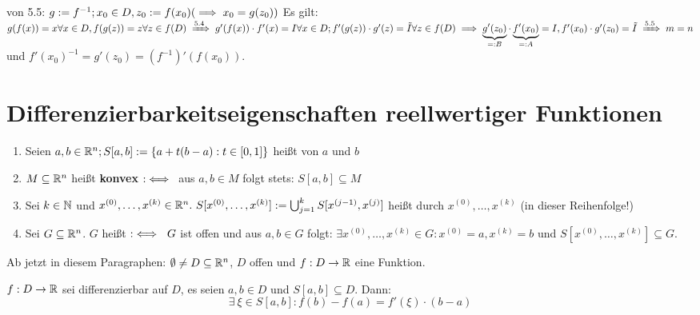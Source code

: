 \documentclass[a4paper,oneside,DIV15,BCOR12mm,chapterprefix=true,headings=onelinechapter]{scrbook}
\begin{document}
\begin{beweis} von 5.5: $g:=f^{-1}; x_0 \in D, z_0:=f(x_0) (\implies x_0 = g(z_0))$
Es gilt: $g(f(x)) = x \forall x \in D, f(g(z)) = z \forall z \in f(D) \folgtnach{5.4} g'(f(x))\cdot f'(x) = I \forall x \in D; f'(g(z))\cdot g'(z) = \tilde{I}
\forall z \in f(D) \folgt \underbrace{g'(z_0)}_{=:B}\cdot \underbrace{f'(x_0)}_{=:A} = I, f'(x_0)\cdot g'(z_0) = \tilde{I} \folgtnach{5.5} m = n$ und $f'(x_0)^{-1} = g'(z_0) = (f^{-1})'(f(x_0))$.
\end{beweis}

\theoremstyle{numberbreak}
\newtheorem{spezialfall}[satz]{Spezialfall}
\chapter{Differenzierbarkeitseigenschaften reellwertiger Funktionen}
\def\grad{\mathop{\rm grad}\nolimits}

\begin{definition}
\begin{enumerate}
\item Seien $a,b \in \mathbb{R}^n; S[a,b]:=\{a+t(b-a): t\in [0,1]\}$ heißt
 von $a$ und $b$
\item $M\subseteq \mathbb{R}^n$ heißt \textbf{konvex} $:\iff$\ aus $a,b \in M$ folgt
stets: $S[a,b] \subseteq M$
\item Sei $k \in \mathbb{N}$ und $x^{(0)},\ldots,x^{(k)} \in \MdR^n.\ S[x^{(0)},\ldots,x^{(k)}]:=\bigcup_{j=1}^{k}S[x^{(j-1)}, x^{(j)}]$ heißt  durch $x^{(0)},\ldots,x^{(k)}$ (in dieser Reihenfolge!)
\item Sei $G \subseteq \mathbb{R}^n$. $G$ heißt $:\iff\ G$ ist offen und aus $a,b \in G$ folgt: $\exists x^{(0)},\ldots,x^{(k)} \in G: x^{(0)}=a, x^{(k)}=b$ und $S[x^{(0)},\ldots,x^{(k)}] \subseteq G$.
\end{enumerate}
\end{definition}

\begin{vereinbarung}
Ab jetzt in diesem Paragraphen: $\emptyset \ne D \subseteq \mathbb{R}^n$, $D$ offen und
$f:D\to \mathbb{R}$ eine Funktion.
\end{vereinbarung}

\begin{satz}
$f:D\to\mathbb{R}$ sei differenzierbar auf $D$, es seien $a,b \in D$ und $S[a,b]\subseteq D$. Dann: $$\exists\ \xi \in S[a,b]: f(b)-f(a)=f'(\xi)\cdot(b-a)$$
$ $%
\end{satz}
\end{document}
